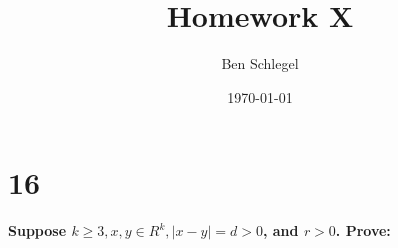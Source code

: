\documentclass{article}
\author{Ben Schlegel
}
\title{Homework X}
\date{\today}
\begin{document}
\maketitle

\section* {16} 
\noindent \textbf{Suppose $k \ge 3, x, y \in R^k,|x-y| = d > 0 $, and $r > 0$. Prove:}
\end{document}
